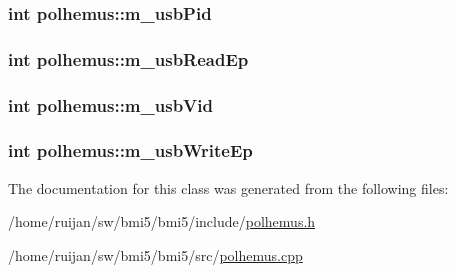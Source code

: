 \hypertarget{classpolhemus_ad02d412a6ae11c75f08694d9d57a18fc}{
\subsubsection[{m\-\_\-usb\-Pid}]{\setlength{\rightskip}{0pt plus 5cm}int polhemus\-::m\-\_\-usb\-Pid\hspace{0.3cm}{\ttfamily [private]}}}\label{classpolhemus_ad02d412a6ae11c75f08694d9d57a18fc}
\hypertarget{classpolhemus_a6895d12a102d37b7585c064562187cf0}{
\subsubsection[{m\-\_\-usb\-Read\-Ep}]{\setlength{\rightskip}{0pt plus 5cm}int polhemus\-::m\-\_\-usb\-Read\-Ep\hspace{0.3cm}{\ttfamily [private]}}}\label{classpolhemus_a6895d12a102d37b7585c064562187cf0}
\hypertarget{classpolhemus_aeca35d88e697df6b3683a8426db177cb}{
\subsubsection[{m\-\_\-usb\-Vid}]{\setlength{\rightskip}{0pt plus 5cm}int polhemus\-::m\-\_\-usb\-Vid\hspace{0.3cm}{\ttfamily [private]}}}\label{classpolhemus_aeca35d88e697df6b3683a8426db177cb}
\hypertarget{classpolhemus_aab4d88a8908c2433cdf0fc314dfff9f9}{
\subsubsection[{m\-\_\-usb\-Write\-Ep}]{\setlength{\rightskip}{0pt plus 5cm}int polhemus\-::m\-\_\-usb\-Write\-Ep\hspace{0.3cm}{\ttfamily [private]}}}\label{classpolhemus_aab4d88a8908c2433cdf0fc314dfff9f9}


The documentation for this class was generated from the following files\-:\begin{DoxyCompactItemize}
\item 
/home/ruijan/sw/bmi5/bmi5/include/\hyperlink{polhemus_8h}{polhemus.\-h}\item 
/home/ruijan/sw/bmi5/bmi5/src/\hyperlink{polhemus_8cpp}{polhemus.\-cpp}\end{DoxyCompactItemize}

